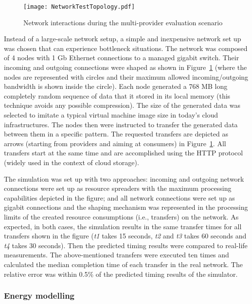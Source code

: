 \documentclass[sort, compress, 5p]{elsarticle}
\begin{document}
\begin{figure}[tb]
\center
\texttt{[image: NetworkTestTopology.pdf]}
\caption{Network interactions during the multi-provider evaluation scenario\label{FIG-NWTest}}
\end{figure}

Instead of a large-scale network setup, a simple and inexpensive network set up was chosen that can  experience bottleneck situations. The network was composed of 4 nodes with 1 Gb Ethernet connections to a managed gigabit switch. Their incoming and outgoing connections were shaped as shown in Figure~\ref{FIG-NWTest} (where the nodes are represented with circles and their maximum allowed incoming/outgoing bandwidth is shown inside the circle). Each node generated a 768 MB long completely random sequence of data that it stored in its local memory (this technique avoids any possible compression). The size of the generated data was selected to imitate a typical virtual machine image size in today's cloud infrastructures. The nodes then were instructed to transfer the generated data between them in a specific pattern. The requested transfers are depicted as arrows (starting from providers and aiming at consumers) in Figure~\ref{FIG-NWTest}. All transfers start at the same time and are accomplished using the HTTP protocol (widely used in the context of cloud storage).

The simulation was set up with two approaches:  incoming and outgoing network connections were set up as resource spreaders with the maximum processing capabilities depicted in the figure; and  all network connections were set up as gigabit connections and the shaping mechanism was represented in the processing limits of the created resource consumptions (i.e., transfers) on the network. As expected, in both cases, the simulation results in the same transfer times for all transfers shown in the figure (\emph{t1} takes 15 seconds, \emph{t2} and \emph{t3} takes 60 seconds and \emph{t4} takes 30 seconds). Then the predicted timing results were compared to real-life measurements. The above-mentioned transfers were executed ten times and calculated the median completion time of each transfer in the real network. The relative error was within 0.5\% of the predicted timing results of the simulator.  

\subsubsection{Energy modelling}
\end{document}
